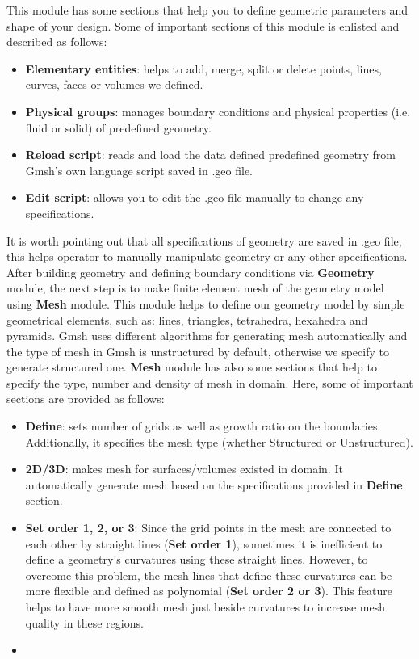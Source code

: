 This module has some sections that help you to define geometric parameters and shape of your design. Some of important sections of this module is enlisted and described as follows:
\begin{itemize}
    \item \textbf{Elementary entities}: helps to add, merge, split or delete points, lines, curves, faces or volumes we defined.
    \item \textbf{Physical groups}: manages boundary conditions and physical properties (i.e. fluid or solid) of predefined geometry.
    \item \textbf{Reload script}: reads and load the data defined predefined geometry from Gmsh's own language script saved in .geo file.
    \item \textbf{Edit script}: allows you to edit the .geo file manually to change any specifications.
\end{itemize}
It is worth pointing out that all specifications of geometry are saved in .geo file, this helps operator to manually manipulate geometry or any other specifications. 
After building geometry and defining boundary conditions via \textbf{Geometry} module, the next step is to make finite element mesh of the geometry model using \textbf{Mesh} module. This module helps to define our geometry model by simple geometrical elements, such as: lines, triangles, tetrahedra, hexahedra and pyramids. Gmsh uses different algorithms for generating mesh automatically and the type of mesh in Gmsh is unstructured by default, otherwise we specify to generate structured one. \textbf{Mesh} module has also some sections that help to specify the type, number and density of mesh in domain. Here, some of important sections are provided as follows:
\begin{itemize}
    \item \textbf{Define}: sets number of grids as well as growth ratio on the boundaries. Additionally, it specifies the mesh type (whether Structured or Unstructured).
    \item \textbf{2D/3D}: makes mesh for surfaces/volumes existed in domain. It automatically generate mesh based on the specifications provided in \textbf{Define} section.
    \item \textbf{Set order 1, 2, or 3}: Since the grid points in the mesh are connected to each other by straight lines (\textbf{Set order 1}), sometimes it is inefficient to define a geometry's curvatures using these straight lines. However, to overcome this problem, the mesh lines that define these curvatures can be more flexible and defined as polynomial (\textbf{Set order 2 or 3}). This feature helps to have more smooth mesh just beside curvatures to increase mesh quality in these regions.
    \item 
\end{itemize}
